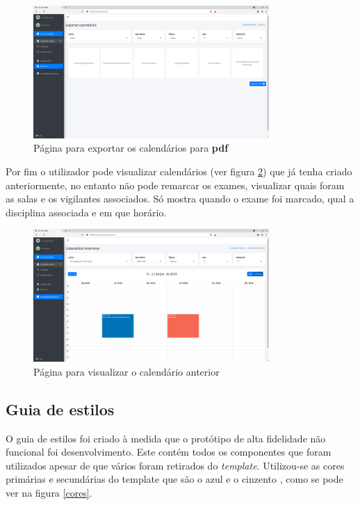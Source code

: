 \documentclass[11pt, twoside]{report}
\begin{document}
 	 \begin{figure}[H] 
 		\centering 							\includegraphics[width=0.8\textwidth,height=0.8\textheight,keepaspectratio]{image/PrototipoAFNF/ExportarPdf}
 		\caption{Página para exportar os calendários para \textbf{pdf} }
 		\label{exportarPDF}
 	\end{figure}
 	
 	
 	Por fim o utilizador pode visualizar calendários (ver figura \ref{calendarioAnterior}) que já tenha criado anteriormente, no entanto não pode remarcar os exames, visualizar quais foram as salas e os vigilantes associados.
 	Só mostra quando o exame foi marcado, qual a disciplina associada e em que horário. 
	
	\begin{figure}[H] 
		\centering 							\includegraphics[width=0.8\textwidth,height=0.8\textheight,keepaspectratio]{image/PrototipoAFNF/calendarioAnterior}
		\caption{Página para visualizar o calendário anterior }
		\label{calendarioAnterior}
	\end{figure}

	\subsection{Guia de estilos}
	
	O guia de estilos foi criado à medida que o protótipo de alta fidelidade não funcional foi desenvolvimento.
	Este contém todos os componentes que foram utilizados apesar de que vários foram retirados do \textit{template}.
	Utilizou-se as cores primárias e secundárias do template que são  o azul e o cinzento , como se pode ver na figura \ref{cores}. 
	
\end{document}
